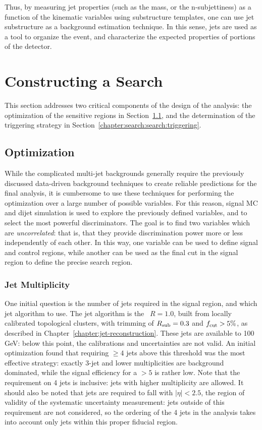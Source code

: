 Thus, by measuring jet properties (such as the mass, or the n-subjettiness) as a function of the kinematic variables using substructure templates, one can use jet substructure as a background estimation technique. In this sense, jets are used as a tool to organize the event, and characterize the expected properties of portions of the detector.
%

\section{Constructing a Search}
\label{chapter:search:search}

This section addresses two critical components of the design of the analysis: the optimization of the sensitive regions in Section~\ref{chapter:search:search:optimization}, and the determination of the triggering strategy in Section~\ref{chapter:search:search:triggering}.

\subsection{Optimization}
\label{chapter:search:search:optimization}

While the complicated multi-jet backgrounds generally require the previously discussed data-driven background techniques to create reliable predictions for the final analysis, it is cumbersome to use these techniques for performing the optimization over a large number of possible variables. For this reason, signal MC and \herwigpp dijet simulation is used to explore the previously defined variables, and to select the most powerful discriminators. The goal is to find two variables which are \textit{uncorrelated}: that is, that they provide discrimination power more or less independently of each other. In this way, one variable can be used to define signal and control regions, while another can be used as the final cut in the signal region to define the precise search region.

\subsubsection{Jet Multiplicity}

One initial question is the number of jets required in the signal region, and which jet algorithm to use. The jet algorithm is the \antikt\ $R=1.0$, built from locally calibrated topological clusters, with trimming of $R_{\rm sub} = 0.3$ and $f_{\rm cut} > 5\%$, as described in Chapter~\ref{chapter:jet-reconstruction}. These jets are available to 100 GeV: below this point, the calibrations and uncertainties are not valid. An initial optimization found that requiring $\geq 4$ jets above this threshold was the most effective strategy: exactly 3-jet and lower multiplicities are background dominated, while the signal efficiency for a $> 5$ is rather low. Note that the requirement on 4 jets is inclusive: jets with higher multiplicity are allowed. It should also be noted that jets are required to fall with $|\eta| < 2.5$, the region of validity of the systematic uncertainty measurement: jets outside of this requirement are not considered, so the ordering of the 4 jets in the analysis takes into account only jets within this proper fiducial region.


